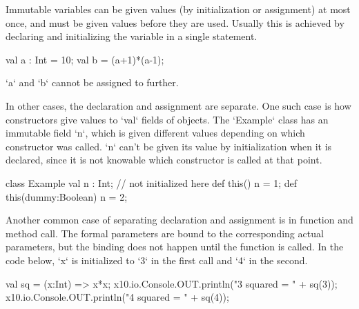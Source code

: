 Immutable variables can be given values (by initialization or assignment) at
most once, and must be given values before they are used.  Usually this is
achieved by declaring and initializing the variable in a single statement.
\begin{xten}
val a : Int = 10;
val b = (a+1)*(a-1);
\end{xten}
\xcd`a` and \xcd`b` cannot be assigned to further.

In other cases, the declaration and assignment are separate.  One such
case is how constructors give values to \xcd`val` fields of objects.  The
\xcd`Example` class has an immutable field \xcd`n`, which is given different
values depending on which constructor was called. \xcd`n` can't be given its
value by initialization when it is declared, since it is not knowable which
constructor is called at that point.  
\begin{xten}
class Example {
  val n : Int; // not initialized here
  def this() { n = 1; }
  def this(dummy:Boolean) { n = 2;}
}
\end{xten}
%

Another common case of separating declaration and assignment is in function
and method call.  The formal parameters are bound to the corresponding actual
parameters, but the binding does not happen until the function is called.  In
the code below, \xcd`x` is initialized to \xcd`3` in the first call and
\xcd`4` in the second.
\begin{xten}
val sq = (x:Int) => x*x;
x10.io.Console.OUT.println("3 squared = " + sq(3));
x10.io.Console.OUT.println("4 squared = " + sq(4));
\end{xten}






